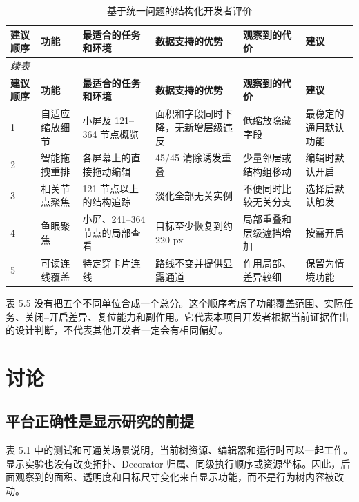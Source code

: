 \documentclass[11pt,a4paper,oneside,extrafontsizes]{memoir}
\begin{document}
\begin{center}
\small
\begin{longtable}{@{}p{} p{} p{} p{} p{} p{}@{}}
\caption{基于统一问题的结构化开发者评价}\label{tab:auto-10}\\
\toprule
\textbf{建议顺序} & \textbf{功能} & \textbf{最适合的任务和环境} & \textbf{数据支持的优势} & \textbf{观察到的代价} & \textbf{建议} \\
\midrule
\endfirsthead
\multicolumn{6}{l}{\small\itshape 续表}\\
\toprule
\textbf{建议顺序} & \textbf{功能} & \textbf{最适合的任务和环境} & \textbf{数据支持的优势} & \textbf{观察到的代价} & \textbf{建议} \\
\midrule
\endhead
1 & 自适应缩放细节 & 小屏及 121–364 节点概览 & 面积和字段同时下降，无新增层级违反 & 低缩放隐藏字段 & 最稳定的通用默认功能 \\
2 & 智能拖拽重排 & 各屏幕上的直接拖动编辑 & 45/45 清除诱发重叠 & 少量邻居或结构组移动 & 编辑时默认开启 \\
3 & 相关节点聚焦 & 121 节点以上的结构追踪 & 淡化全部无关实例 & 不便同时比较无关分支 & 选择后默认触发 \\
4 & 鱼眼聚焦 & 小屏、241–364 节点的局部查看 & 目标至少恢复到约 220 px & 局部重叠和层级遮挡增加 & 按需开启 \\
5 & 可读连线覆盖 & 特定穿卡片连线 & 路线不变并提供显露通道 & 作用局部、差异较细 & 保留为情境功能 \\
\bottomrule
\end{longtable}
\end{center}

表 5.5 没有把五个不同单位合成一个总分。这个顺序考虑了功能覆盖范围、实际任务、关闭–开启差异、复位能力和副作用。它代表本项目开发者根据当前证据作出的设计判断，不代表其他开发者一定会有相同偏好。

\chapter{讨论}

\section{平台正确性是显示研究的前提}

表 5.1 中的测试和可通关场景说明，当前树资源、编辑器和运行时可以一起工作。显示实验也没有改变拓扑、Decorator 归属、同级执行顺序或资源坐标。因此，后面观察到的面积、透明度和目标尺寸变化来自显示功能，而不是行为树内容被改动。
\end{document}
